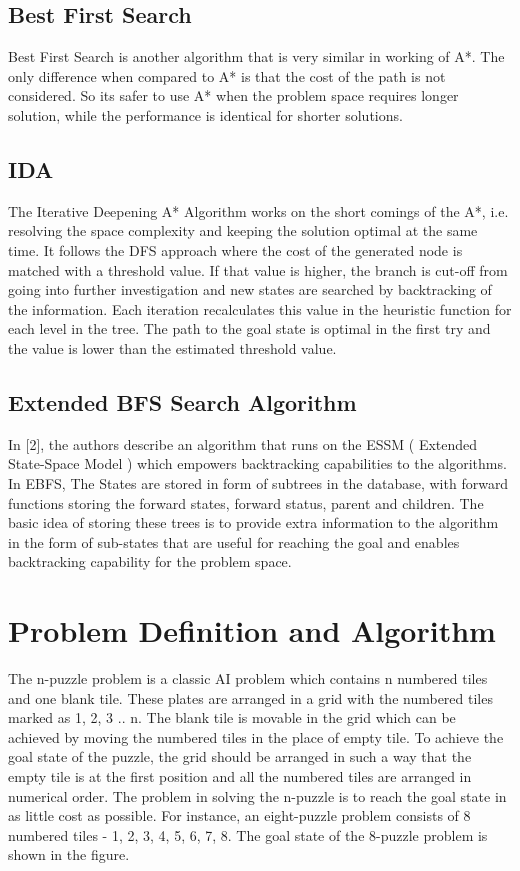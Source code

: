\documentclass{svproc}
\begin{document}
\subsection{Best First Search}
 Best First Search is another algorithm that is very similar in working of A*. The only difference when compared to A* is that the cost of the path is not considered. So its safer to use A* when the problem space requires longer  solution, while the performance is identical for shorter solutions.
\subsection{IDA} 
The Iterative Deepening A* Algorithm works on the short comings of the A*, i.e. resolving the space complexity and keeping the solution optimal at the same time. It follows the DFS approach where the cost of the generated node is matched with a threshold value. If that value is higher, the branch is cut-off from going into further investigation and new states are searched by backtracking of the information. Each iteration recalculates this value in the heuristic function for each level in the tree. The path to the goal state is optimal in the first try and the value is lower than the estimated threshold value.
\subsection{Extended BFS Search Algorithm}



In [2], the authors describe an algorithm that runs on the ESSM ( Extended State-Space Model ) which empowers backtracking capabilities to the algorithms. In EBFS, The States are stored in form of subtrees in the database, with forward functions storing the forward states, forward status, parent and children. The basic idea of storing these trees is to provide extra information to the algorithm in the form of sub-states that are useful for reaching the goal and enables backtracking capability for the problem space.


\section{Problem Definition and Algorithm}
The n-puzzle problem is a classic AI problem which contains n numbered tiles and one blank tile. These plates are arranged in a grid with the numbered tiles marked as 1, 2, 3 .. n. The blank tile is movable in the grid which can be achieved by moving the numbered tiles in the place of empty tile. To achieve the goal state of the puzzle, the grid should be arranged in such a way that the empty tile is at the first position and all the numbered tiles are arranged in numerical order. The problem in solving the n-puzzle is to reach the goal state in as little cost as possible. For instance, an eight-puzzle problem consists of 8 numbered tiles - 1, 2, 3, 4, 5, 6, 7, 8. The goal state of the 8-puzzle problem is shown in the figure. \\
\end{document}
